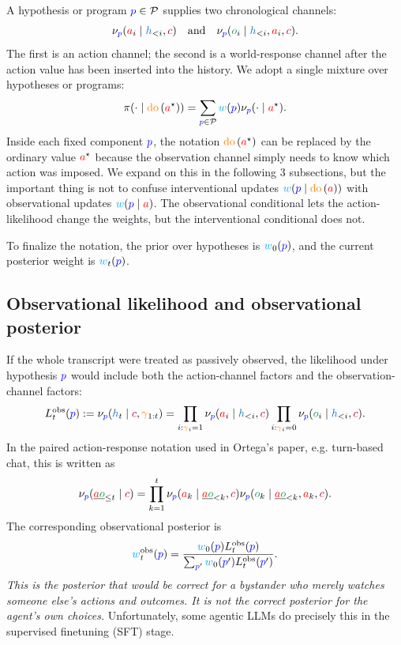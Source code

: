 \documentclass[11pt]{article}
\newcommand{\ProgramSet}{\mathcal{P}}
\newcommand{\action}{\ensuremath{\textcolor{red}{a}}}
\newcommand{\obs}{\ensuremath{\textcolor{ForestGreen}{o}}}
\newcommand{\program}{\ensuremath{\textcolor{blue}{p}}}
\newcommand{\contextsym}{\ensuremath{\textcolor{purple}{c}}}
\newcommand{\gate}{\ensuremath{\textcolor{orange}{\gamma}}}
\newcommand{\weight}{\ensuremath{\textcolor{cyan}{w}}}
\newcommand{\history}{\ensuremath{\textcolor{RoyalBlue}{h}}}
\newcommand{\policy}{\ensuremath{\pi}}
\newcommand{\kernel}{\ensuremath{\nu}}
\newcommand{\lik}{\ensuremath{L}}
\newcommand{\obslik}{\ensuremath{\lik^{\mathrm{obs}}}}
\newcommand{\obsweight}{\ensuremath{\weight^{\mathrm{obs}}}}
\newcommand{\pairhistory}{\ensuremath{\underline{\action\obs}}}
\newcommand{\doop}{\operatorname{\textcolor{orange}{do}}}
\newcommand{\intervene}[1]{\ensuremath{\doop \left(#1\right)}}
\begin{document}
A hypothesis or program
$\program\in\ProgramSet$ supplies two chronological channels:
\[
  \kernel_{\program}(\action_i\mid \history_{<i},\contextsym)
  \quad\text{and}\quad
  \kernel_{\program}(\obs_i\mid \history_{<i},\action_i,\contextsym).
\]
The first is an action channel; the second is a world-response channel after the
action value has been inserted into the history. 
We adopt a single mixture over hypotheses or programs:
\[
  \policy(\cdot \mid \intervene{\action^\star})
  =
  \sum_{\program\in\ProgramSet}\weight(\program)\kernel_{\program}(\cdot \mid \action^\star).
\]
Inside each fixed component $\program$, the notation $\intervene{\action^\star}$ can be replaced
by the ordinary value $\action^\star$ because the observation channel simply needs to
know which action was imposed. We expand on this in the following 3 subsections, but the 
important thing is not to confuse interventional updates $\weight(\program\mid \intervene{\action})$ with observational updates $\weight(\program\mid \action)$. The observational conditional lets the action-likelihood change the weights, but
the interventional conditional does not. 

To finalize the notation, the prior over hypotheses is
$\weight_0(\program)$, and the current posterior weight is $\weight_t(\program)$.






\subsection{Observational likelihood and observational posterior}

If the whole transcript were treated as passively observed, the likelihood under
hypothesis $\program$ would include both the action-channel factors and the
observation-channel factors:
\[
  \obslik_t(\program)
  :=
  \kernel_{\program}(\history_t\mid \contextsym,\gate_{1:t})
  =
  \prod_{i:\gate_i=1}\kernel_{\program}(\action_i\mid \history_{<i},\contextsym)
  \prod_{i:\gate_i=0}\kernel_{\program}(\obs_i\mid \history_{<i},\contextsym).
\]
In the paired action-response notation used in Ortega's paper, e.g. turn-based chat, this is
written as
\[
  \kernel_{\program}(\pairhistory_{\le t}\mid \contextsym)
  =
  \prod_{k=1}^{t}
  \kernel_{\program}(\action_k\mid \pairhistory_{<k},\contextsym)
  \kernel_{\program}(\obs_k\mid \pairhistory_{<k},\action_k,\contextsym).
\]
The corresponding observational posterior is
\[
  \obsweight_t(\program)
  =
  \frac{\weight_0(\program)\obslik_t(\program)}
       {\sum_{\program'} \weight_0(\program')\obslik_t(\program')}.
\]
\emph{This is the posterior that would be correct for a bystander who merely watches
someone else's actions and outcomes. It is not the correct posterior for the
agent's own choices.} Unfortunately, some agentic LLMs do precisely this in the supervised finetuning (SFT) stage. 
\end{document}
